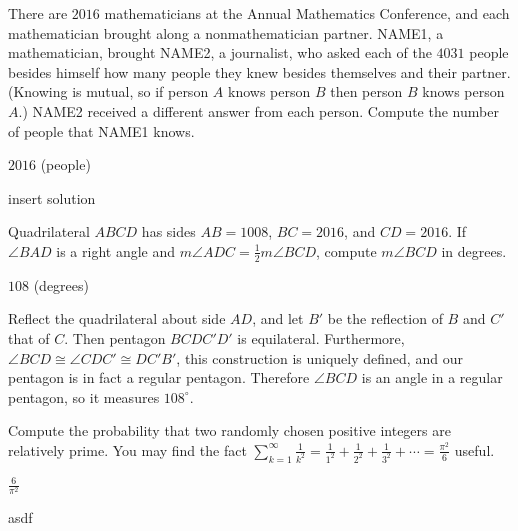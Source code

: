 \documentclass[11pt]{article}
\begin{document}
\begin{problem}
There are $2016$ mathematicians at the Annual Mathematics Conference, and each mathematician brought along a nonmathematician partner. NAME1, a mathematician, brought NAME2, a journalist, who asked each of the $4031$ people besides himself how many people they knew besides themselves and their partner. (Knowing is mutual, so if person $A$ knows person $B$ then person $B$ knows person $A$.) NAME2 received a different answer from each person. Compute the number of people that NAME1 knows.
\end{problem}

\begin{answer}
$\boxed{2016}$ (people)
\end{answer}

\begin{solution}
insert solution
\end{solution}


\begin{problem}%
Quadrilateral $ABCD$ has sides $AB = 1008$, $BC = 2016$, and $CD = 2016$. If $\angle BAD$ is a right angle and $m\angle ADC = \frac{1}{2}m\angle BCD$, compute $m\angle BCD$ in degrees.
\end{problem}

\begin{answer}
$\boxed{108}$ (degrees)
\end{answer}

\begin{solution}
Reflect the quadrilateral about side $AD$, and let $B'$ be the reflection of $B$ and $C'$ that of $C$. Then pentagon $BCDC'D'$ is equilateral. Furthermore, $\angle BCD \cong \angle CDC' \cong DC'B'$, this construction is uniquely defined, and our pentagon is in fact a regular pentagon. Therefore $\angle BCD$ is an angle in a regular pentagon, so it measures $\boxed{108^\circ}$.
\end{solution}


\begin{problem}
Compute the probability that two randomly chosen positive integers are relatively prime. You may find the fact $\sum\limits_{k = 1}^\infty \frac{1}{k^2} = \frac{1}{1^2} + \frac{1}{2^2} + \frac{1}{3^2} + \cdots = \frac{\pi^2}{6}$ useful.
\end{problem}

\begin{answer}
$\boxed{\frac{6}{\pi^2}}$
\end{answer}

\begin{solution}
asdf
\end{solution}
\end{document}
